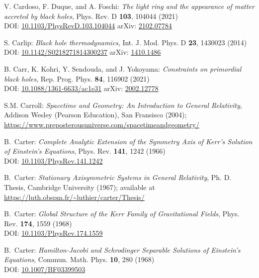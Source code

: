 \begin{thebibliography}{123}
V. Cardoso, F. Duque, and A. Foschi:
{\em The light ring and the appearance of matter accreted by black holes},
Phys. Rev. D {\bf 103}, 104044 (2021)\\
DOI: \href{https://doi.org/10.1103/PhysRevD.103.104044}{10.1103/PhysRevD.103.104044}\hfill
arXiv: \href{https://arxiv.org/abs/2102.07784}{2102.07784}

S. Carlip:
{\em Black hole thermodynamics},
Int. J. Mod. Phys. D {\bf 23}, 1430023 (2014)\\
DOI: \href{https://doi.org/10.1142/S0218271814300237}{10.1142/S0218271814300237}\hfill
arXiv: \href{https://arxiv.org/abs/1410.1486}{1410.1486}

B. Carr, K. Kohri, Y. Sendouda, and J. Yokoyama:
{\em Constraints on primordial black holes},
Rep. Prog. Phys. {\bf 84}, 116902 (2021)\\
DOI: \href{https://doi.org/10.1088/1361-6633/ac1e31}{10.1088/1361-6633/ac1e31}\hfill
arXiv: \href{https://arxiv.org/abs/2002.12778}{2002.12778}

S.M. Carroll: \emph{Spacetime and Geometry: An Introduction to General Relativity},
Addison Wesley (Pearson Education), San Fransisco (2004); \\
\url{https://www.preposterousuniverse.com/spacetimeandgeometry/}

B.~Carter:
{\em Complete Analytic Extension of the Symmetry Axis of Kerr's Solution of Einstein's Equations},
Phys. Rev. {\bf 141}, 1242 (1966)\\
DOI: \href{https://doi.org/10.1103/PhysRev.141.1242}{10.1103/PhysRev.141.1242}

B.~Carter: {\em Stationary Axisymmetric Systems in General Relativity},
Ph. D. Thesis, Cambridge University (1967); available at\\
\url{https://luth.obspm.fr/~luthier/carter/Thesis/}

B.~Carter:
{\em Global Structure of the Kerr Family of Gravitational Fields},
Phys. Rev. {\bf 174}, 1559 (1968)\\
DOI: \href{https://doi.org/10.1103/PhysRev.174.1559}{10.1103/PhysRev.174.1559}

B.~Carter:
{\em Hamilton-Jacobi and Schrodinger Separable Solutions of Einstein's Equations},
Commun. Math. Phys. {\bf 10}, 280 (1968)\\
DOI: \href{https://doi.org/10.1007/BF03399503}{10.1007/BF03399503}


\end{thebibliography}
